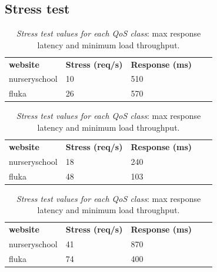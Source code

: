 \subsection{Stress test}

\begin{table}
    \centering
    \begin{subtable}{0.5\textwidth}
        \begin{tabular}{|l|ll|ll}
        \cline{1-3}
        \textbf{website} & \multicolumn{1}{l|}{\textbf{Stress (req/s)}} & \textbf{Response (ms)} &  &  \\ \cline{1-3}
        nurseryschool    & 10                                           & 510                    &  &  \\ \cline{1-1}
        fluka            & 26                                           & 570                    &  &  \\ \cline{1-3}
        \end{tabular}
    \caption{Test}
    \end{subtable}
    \begin{subtable}{0.5\textwidth}
        \begin{tabular}{|l|ll|ll}
        \cline{1-3}
        \textbf{website} & \multicolumn{1}{l|}{\textbf{Stress (req/s)}} & \textbf{Response (ms)} &  &  \\ \cline{1-3}
        nurseryschool    & 18                                           & 240                    &  &  \\ \cline{1-1}
        fluka            & 48                                           & 103                    &  &  \\ \cline{1-3}
        \end{tabular}
    \caption{Standard}
    \end{subtable}
    \begin{subtable}{0.5\textwidth}
        \begin{tabular}{|l|ll|ll}
        \cline{1-3}
        \textbf{website} & \multicolumn{1}{l|}{\textbf{Stress (req/s)}} & \textbf{Response (ms)} &  &  \\ \cline{1-3}
        nurseryschool    & 41  & 870   &  &  \\ \cline{1-1}
        fluka            & 74  & 400   &  &  \\ \cline{1-3}
        \end{tabular}
    \caption{Critical}
    \end{subtable}
    \vspace{-1.5em}
    \caption{\emph{Stress test values for each QoS class}: max response latency and minimum load throughput.}
    \vspace{-2.2em}
    \label{tab:stress-response}
\end{table}

